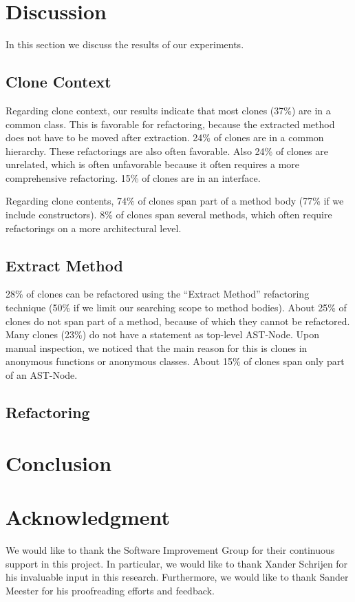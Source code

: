 \documentclass[sigconf,review, table]{acmart}
\begin{document}
\section{Discussion}
In this section we discuss the results of our experiments.

\subsection{Clone Context}
Regarding clone context, our results indicate that most clones (37\%) are in a common class. This is favorable for refactoring, because the extracted method does not have to be moved after extraction. 24\% of clones are in a common hierarchy. These refactorings are also often favorable. Also 24\% of clones are unrelated, which is often unfavorable because it often requires a more comprehensive refactoring. 15\% of clones are in an interface.

Regarding clone contents, 74\% of clones span part of a method body (77\% if we include constructors). 8\% of clones span several methods, which often require refactorings on a more architectural level.

\subsection{Extract Method}
28\% of clones can be refactored using the ``Extract Method'' refactoring technique (50\% if we limit our searching scope to method bodies). About 25\% of clones do not span part of a method, because of which they cannot be refactored. Many clones (23\%) do not have a statement as top-level AST-Node. Upon manual inspection, we noticed that the main reason for this is clones in anonymous functions or anonymous classes. About 15\% of clones span only part of an AST-Node.

\subsection{Refactoring}


\section{Conclusion}

\section*{Acknowledgment}
We would like to thank the Software Improvement Group for their continuous support in this project. In particular, we would like to thank Xander Schrijen for his invaluable input in this research. Furthermore, we would like to thank Sander Meester for his proofreading efforts and feedback.



\end{document}
